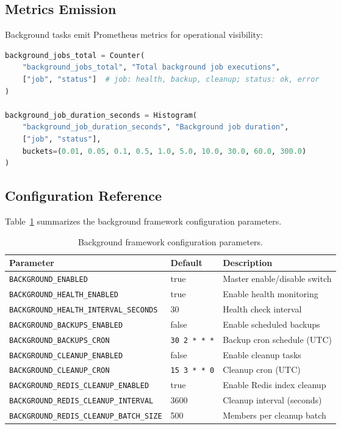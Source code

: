 \subsection{Metrics Emission}

Background tasks emit Prometheus metrics for operational visibility:

\begin{lstlisting}[language=Python, caption={Background job metrics (conceptual).}]
background_jobs_total = Counter(
    "background_jobs_total", "Total background job executions",
    ["job", "status"]  # job: health, backup, cleanup; status: ok, error
)

background_job_duration_seconds = Histogram(
    "background_job_duration_seconds", "Background job duration",
    ["job", "status"],
    buckets=(0.01, 0.05, 0.1, 0.5, 1.0, 5.0, 10.0, 30.0, 60.0, 300.0)
)
\end{lstlisting}

\subsection{Configuration Reference}

Table~\ref{tab:background-config} summarizes the background framework configuration parameters.

\begin{table}[ht]
\centering
\caption{Background framework configuration parameters.}
\label{tab:background-config}
\small
\begin{tabular}{lll}
\hline
\textbf{Parameter} & \textbf{Default} & \textbf{Description} \\
\hline
\texttt{BACKGROUND\_ENABLED} & true & Master enable/disable switch \\
\texttt{BACKGROUND\_HEALTH\_ENABLED} & true & Enable health monitoring \\
\texttt{BACKGROUND\_HEALTH\_INTERVAL\_SECONDS} & 30 & Health check interval \\
\texttt{BACKGROUND\_BACKUPS\_ENABLED} & false & Enable scheduled backups \\
\texttt{BACKGROUND\_BACKUPS\_CRON} & \texttt{30 2 * * *} & Backup cron schedule (UTC) \\
\texttt{BACKGROUND\_CLEANUP\_ENABLED} & false & Enable cleanup tasks \\
\texttt{BACKGROUND\_CLEANUP\_CRON} & \texttt{15 3 * * 0} & Cleanup cron (UTC) \\
\texttt{BACKGROUND\_REDIS\_CLEANUP\_ENABLED} & true & Enable Redis index cleanup \\
\texttt{BACKGROUND\_REDIS\_CLEANUP\_INTERVAL} & 3600 & Cleanup interval (seconds) \\
\texttt{BACKGROUND\_REDIS\_CLEANUP\_BATCH\_SIZE} & 500 & Members per cleanup batch \\
\hline
\end{tabular}
\end{table}

